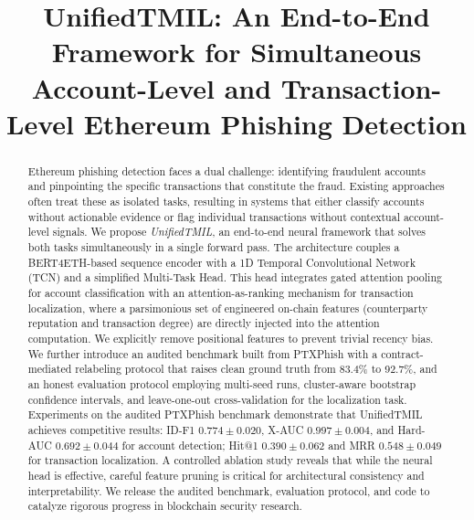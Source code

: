 \documentclass[conference]{IEEEtran}
\begin{document}
\title{UnifiedTMIL: An End-to-End Framework for Simultaneous Account-Level and Transaction-Level Ethereum Phishing Detection}

\author{
}

\maketitle

\begin{abstract}
Ethereum phishing detection faces a dual challenge: identifying fraudulent accounts and pinpointing the specific transactions that constitute the fraud. Existing approaches often treat these as isolated tasks, resulting in systems that either classify accounts without actionable evidence or flag individual transactions without contextual account-level signals. We propose \emph{UnifiedTMIL}, an end-to-end neural framework that solves both tasks simultaneously in a single forward pass. The architecture couples a BERT4ETH-based sequence encoder with a 1D Temporal Convolutional Network (TCN) and a simplified Multi-Task Head. This head integrates gated attention pooling for account classification with an attention-as-ranking mechanism for transaction localization, where a parsimonious set of engineered on-chain features (counterparty reputation and transaction degree) are directly injected into the attention computation. We explicitly remove positional features to prevent trivial recency bias. We further introduce an audited benchmark built from PTXPhish with a contract-mediated relabeling protocol that raises clean ground truth from 83.4\% to 92.7\%, and an honest evaluation protocol employing multi-seed runs, cluster-aware bootstrap confidence intervals, and leave-one-out cross-validation for the localization task. Experiments on the audited PTXPhish benchmark demonstrate that UnifiedTMIL achieves competitive results: ID-F1 $0.774\pm0.020$, X-AUC $0.997\pm0.004$, and Hard-AUC $0.692\pm0.044$ for account detection; Hit@1 $0.390\pm0.062$ and MRR $0.548\pm0.049$ for transaction localization. A controlled ablation study reveals that while the neural head is effective, careful feature pruning is critical for architectural consistency and interpretability. We release the audited benchmark, evaluation protocol, and code to catalyze rigorous progress in blockchain security research.
\end{abstract}
\end{document}
